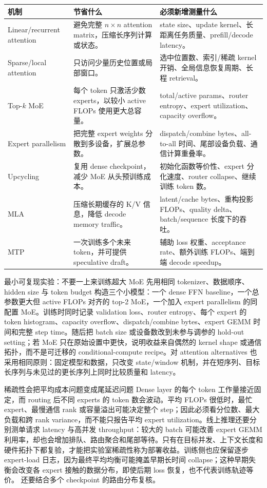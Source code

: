 \documentclass[a4paper]{article}
\begin{document}
\begin{longtable}{p{}p{}p{}}
\toprule
机制 & 节省什么 & 必须新增测量什么 \\
\midrule
Linear/recurrent attention & 避免完整 $n\times n$ attention matrix，压缩长序列计算或状态。 & state size、update kernel、长距离任务质量、prefill/decode latency。 \\
Sparse/local attention & 只访问少量历史位置或局部窗口。 & 选中位置数、索引/稀疏 kernel 开销、全局信息恢复周期、长程 retrieval。 \\
Top-$k$ MoE & 每个 token 只激活少数 experts，以较小 active FLOPs 使用更大总容量。 & total/active params、router entropy、expert utilization、capacity overflow。 \\
Expert parallelism & 把完整 expert weights 分散到多设备，扩展总参数。 & dispatch/combine bytes、all-to-all 时间、尾部设备负载、通信计算重叠率。 \\
Upcycling & 复用 dense checkpoint，减少 MoE 从头预训练成本。 & 初始化函数等价性、expert 分化速度、router collapse、继续训练 token 数。 \\
MLA & 压缩长期缓存的 K/V 信息，降低 decode memory traffic。 & latent/cache bytes、重构投影 FLOPs、quality delta、batch/sequence 长度下的吞吐。 \\
MTP & 一次训练多个未来 token，并可提供 speculative draft。 & 辅助 loss 权重、acceptance rate、额外训练 FLOPs、端到端 decode speedup。 \\
\bottomrule
\end{longtable}

\begin{importantbox}{最小可复现实验：不要一上来训练超大 MoE}
先用相同 tokenizer、数据顺序、hidden size 与 token budget 构造三个小模型：一个 dense FFN baseline，一个总参数更大但 active FLOPs 对齐的 top-2 MoE，一个加入 expert parallelism 的同配置 MoE。训练时同时记录 validation loss、router entropy、每个 expert 的 token histogram、capacity overflow、dispatch/combine bytes、expert GEMM 时间和完整 step time。随后把 batch size 或设备数改到未参与调参的 hold-out setting；若 MoE 只在原始设置中更快，说明收益来自偶然的 kernel shape 或通信拓扑，而不是可迁移的 conditional-compute recipe。对 attention alternatives 也采用相同原则：固定模型和数据，只改变 state/window 机制，并在短序列、目标长序列与未见过的更长序列上同时比较质量和 latency。
\end{importantbox}

\begin{warningbox}{稀疏性会把平均成本问题变成尾延迟问题}
Dense layer 的每个 token 工作量接近固定，而 routing 后不同 experts 的 token 数会波动。平均 FLOPs 很低时，最忙 expert、最慢通信 rank 或容量溢出可能决定整个 step；因此必须看分位数、最大负载和跨 rank variance，而不能只报告平均 expert utilization。线上推理还要分别测单请求 latency 与高并发 throughput：较大的 batch 可能改善 expert GEMM 利用率，却也会增加排队、路由聚合和尾部等待。只有在目标并发、上下文长度和硬件拓扑下都复验，才能把实验室稀疏性称为部署收益。训练侧也应保留逐步 expert-load 日志，因为最终平均均衡可能掩盖早期长时间 collapse；这种早期失衡会改变各 expert 接触的数据分布，即使后期 loss 恢复，也不代表训练轨迹等价。
还要结合多个 checkpoint 的路由分布复核。
\end{warningbox}
\end{document}
